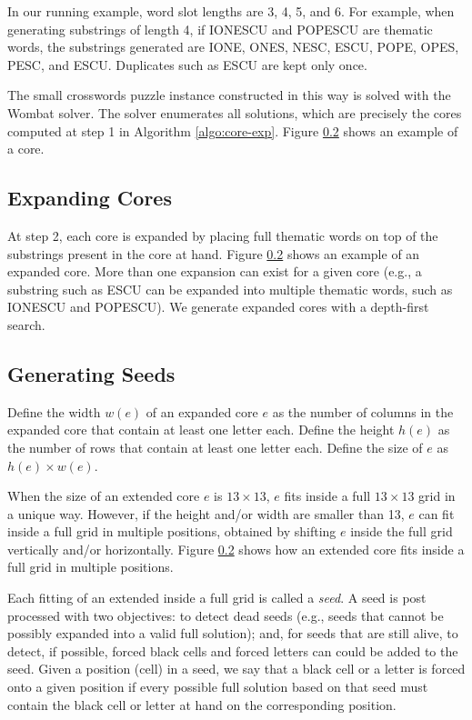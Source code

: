In our running example, word slot lengths are 3, 4, 5, and 6.
For example, when generating substrings of length 4,
if IONESCU and POPESCU are thematic words,
the substrings generated are IONE, ONES, NESC, ESCU, POPE, OPES, PESC, and ESCU.
Duplicates such as ESCU are kept only once.

The small crosswords puzzle instance constructed in this way is 
solved with the {\sc Wombat} solver.
The solver enumerates all solutions, which are precisely the 
cores computed at step 1 in Algorithm \ref{algo:core-exp}.
Figure \ref{} shows an example of a core.



\subsection{Expanding Cores}

At step 2, each core is expanded by placing full thematic words on top of the substrings present in the core at hand. Figure \ref{} shows an example of an expanded core. More than one expansion can exist for a given core (e.g., a substring such as ESCU can be expanded into multiple thematic words, such as IONESCU and POPESCU).
We generate expanded cores with a depth-first search.

\subsection{Generating Seeds}

Define the width $w(e)$ of an expanded core $e$ as the number of columns in the expanded core that contain at least one letter each.
Define the height $h(e)$ as the number of rows that contain at least one letter each.
Define the size of $e$ as $h(e) \times w(e)$.

When the size of an extended core $e$ is $13 \times 13$, $e$ fits inside a full $13 \times 13$ grid in a unique way. However,
if the height and/or width are smaller than 13, $e$ can fit inside a full grid in multiple positions,
obtained by shifting $e$ inside the full grid vertically and/or horizontally.
Figure \ref{} shows how an extended core fits inside a full grid in multiple positions.

Each fitting of an extended inside a full grid is called a \emph{seed}.
A seed is post processed with two objectives: to detect dead seeds 
(e.g., seeds that cannot be possibly expanded into a valid full solution); 
and, for seeds that are still alive, to detect, if possible, 
forced black cells and forced letters can could be added to the seed.
Given a position (cell) in a seed,
we say that a black cell or a letter is forced onto a 
given position if 
every possible full solution based on that seed must contain 
the black cell or letter at hand on the corresponding position.

